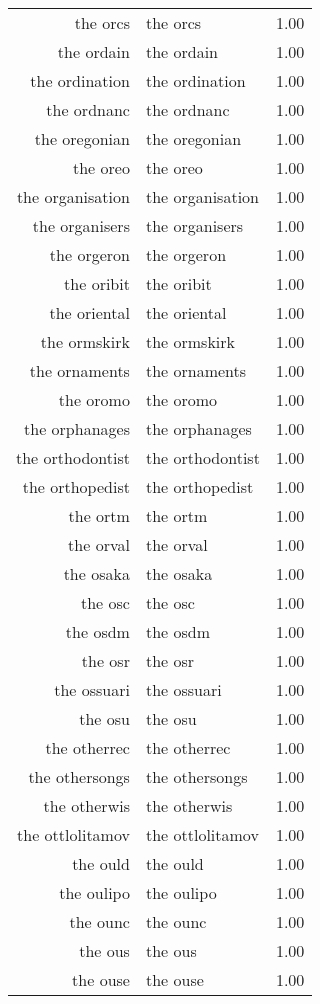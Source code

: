 \begin{table}[ht]
\begin{tabular}{rlr}
  the orcs & the orcs & 1.00 \\ 
  the ordain & the ordain & 1.00 \\ 
  the ordination & the ordination & 1.00 \\ 
  the ordnanc & the ordnanc & 1.00 \\ 
  the oregonian & the oregonian & 1.00 \\ 
  the oreo & the oreo & 1.00 \\ 
  the organisation & the organisation & 1.00 \\ 
  the organisers & the organisers & 1.00 \\ 
  the orgeron & the orgeron & 1.00 \\ 
  the oribit & the oribit & 1.00 \\ 
  the oriental & the oriental & 1.00 \\ 
  the ormskirk & the ormskirk & 1.00 \\ 
  the ornaments & the ornaments & 1.00 \\ 
  the oromo & the oromo & 1.00 \\ 
  the orphanages & the orphanages & 1.00 \\ 
  the orthodontist & the orthodontist & 1.00 \\ 
  the orthopedist & the orthopedist & 1.00 \\ 
  the ortm & the ortm & 1.00 \\ 
  the orval & the orval & 1.00 \\ 
  the osaka & the osaka & 1.00 \\ 
  the osc & the osc & 1.00 \\ 
  the osdm & the osdm & 1.00 \\ 
  the osr & the osr & 1.00 \\ 
  the ossuari & the ossuari & 1.00 \\ 
  the osu & the osu & 1.00 \\ 
  the otherrec & the otherrec & 1.00 \\ 
  the othersongs & the othersongs & 1.00 \\ 
  the otherwis & the otherwis & 1.00 \\ 
  the ottlolitamov & the ottlolitamov & 1.00 \\ 
  the ould & the ould & 1.00 \\ 
  the oulipo & the oulipo & 1.00 \\ 
  the ounc & the ounc & 1.00 \\ 
  the ous & the ous & 1.00 \\ 
  the ouse & the ouse & 1.00 \\ 

\end{tabular}
\end{table}
